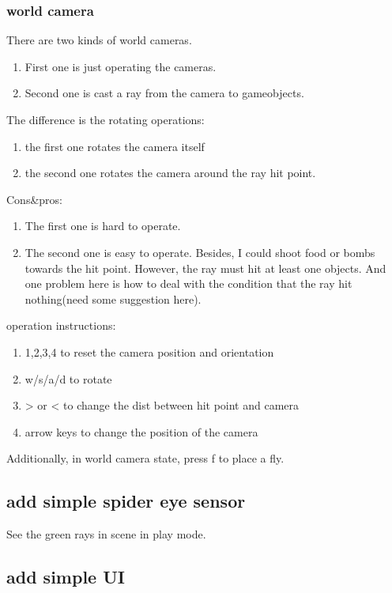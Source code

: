 \documentclass[11pt]{article}
\begin{document}
\subsubsection{world camera}
\label{sec-1-1-3}
There are two kinds of world cameras.
\begin{enumerate}
\item First one is just operating the cameras.
\item Second one is cast a ray from the camera to gameobjects.
\end{enumerate}
The difference is the rotating operations:
\begin{enumerate}
\item the first one rotates the camera itself
\item the second one rotates the camera around the ray hit point.
\end{enumerate}
Cons\&pros:
\begin{enumerate}
\item The first one is hard to operate.
\item The second one is easy to operate. Besides, I could shoot food or bombs towards the hit point. However, the ray must hit at least one objects. And one problem here is how to deal with the condition that the ray hit nothing(need some suggestion here).
\end{enumerate}
operation instructions:
\begin{enumerate}
\item 1,2,3,4 to reset the camera position and orientation
\item w/s/a/d to rotate
\item > or < to change the dist between hit point and camera
\item arrow keys to change the position of the camera
\end{enumerate}

Additionally, in world camera state, press f to place a fly.

\subsection{add simple spider eye sensor}
\label{sec-1-2}
See the green rays in scene in play mode.
\subsection{add simple UI}
\label{sec-1-3}
\end{document}
